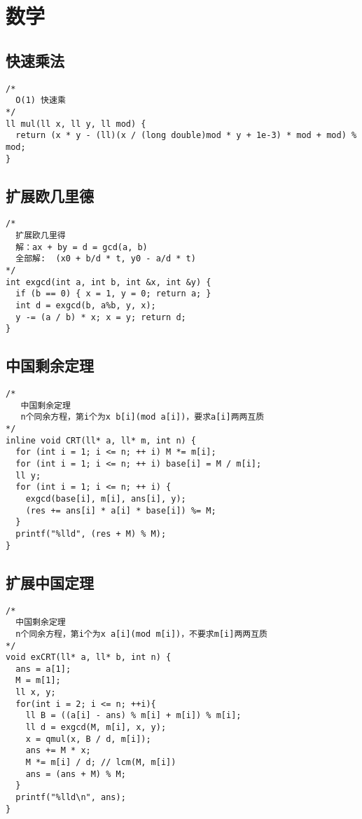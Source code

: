 \chapter{数学}

\section{快速乘法}

\begin{lstlisting}
/*
  O(1) 快速乘
*/
ll mul(ll x, ll y, ll mod) {
  return (x * y - (ll)(x / (long double)mod * y + 1e-3) * mod + mod) % mod;
}
\end{lstlisting}

\section{扩展欧几里德}

\begin{lstlisting}
/*
  扩展欧几里得
  解：ax + by = d = gcd(a, b)
  全部解:  (x0 + b/d * t, y0 - a/d * t)
*/
int exgcd(int a, int b, int &x, int &y) {
  if (b == 0) { x = 1, y = 0; return a; }
  int d = exgcd(b, a%b, y, x);
  y -= (a / b) * x; x = y; return d;
}
\end{lstlisting}

\section{中国剩余定理}

\begin{lstlisting}
/*
   中国剩余定理
   n个同余方程，第i个为x b[i](mod a[i])，要求a[i]两两互质
*/
inline void CRT(ll* a, ll* m, int n) {
  for (int i = 1; i <= n; ++ i) M *= m[i];
  for (int i = 1; i <= n; ++ i) base[i] = M / m[i];
  ll y;
  for (int i = 1; i <= n; ++ i) {
    exgcd(base[i], m[i], ans[i], y);
    (res += ans[i] * a[i] * base[i]) %= M;
  }
  printf("%lld", (res + M) % M);
}

\end{lstlisting}

\section{扩展中国定理}
\begin{lstlisting}
/*
  中国剩余定理
  n个同余方程，第i个为x a[i](mod m[i])，不要求m[i]两两互质
*/
void exCRT(ll* a, ll* b, int n) {
  ans = a[1];
  M = m[1];
  ll x, y;
  for(int i = 2; i <= n; ++i){
    ll B = ((a[i] - ans) % m[i] + m[i]) % m[i];
    ll d = exgcd(M, m[i], x, y);
    x = qmul(x, B / d, m[i]);
    ans += M * x;
    M *= m[i] / d; // lcm(M, m[i])
    ans = (ans + M) % M;
  }
  printf("%lld\n", ans);
}
\end{lstlisting}

